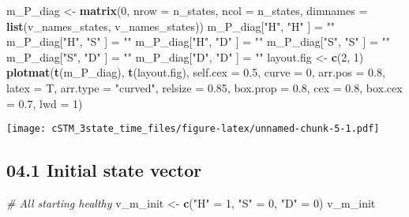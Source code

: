 \documentclass[
]{article}
\newenvironment{Shaded}{\begin{snugshade}}{\end{snugshade}}
\newcommand{\AttributeTok}[1]{\textcolor[rgb]{0.13,0.29,0.53}{#1}}
\newcommand{\CommentTok}[1]{\textcolor[rgb]{0.56,0.35,0.01}{\textit{#1}}}
\newcommand{\DecValTok}[1]{\textcolor[rgb]{0.00,0.00,0.81}{#1}}
\newcommand{\FloatTok}[1]{\textcolor[rgb]{0.00,0.00,0.81}{#1}}
\newcommand{\FunctionTok}[1]{\textcolor[rgb]{0.13,0.29,0.53}{\textbf{#1}}}
\newcommand{\NormalTok}[1]{#1}
\newcommand{\OtherTok}[1]{\textcolor[rgb]{0.56,0.35,0.01}{#1}}
\newcommand{\StringTok}[1]{\textcolor[rgb]{0.31,0.60,0.02}{#1}}
\begin{document}
\begin{Shaded}
\begin{Highlighting}[]
\NormalTok{m\_P\_diag }\OtherTok{\textless{}{-}} \FunctionTok{matrix}\NormalTok{(}\DecValTok{0}\NormalTok{, }\AttributeTok{nrow =}\NormalTok{ n\_states, }\AttributeTok{ncol =}\NormalTok{ n\_states, }\AttributeTok{dimnames =} \FunctionTok{list}\NormalTok{(v\_names\_states, v\_names\_states))}
\NormalTok{m\_P\_diag[}\StringTok{"H"}\NormalTok{, }\StringTok{"H"}\NormalTok{ ] }\OtherTok{=} \StringTok{""}
\NormalTok{m\_P\_diag[}\StringTok{"H"}\NormalTok{, }\StringTok{"S"}\NormalTok{ ] }\OtherTok{=} \StringTok{""} 
\NormalTok{m\_P\_diag[}\StringTok{"H"}\NormalTok{, }\StringTok{"D"}\NormalTok{ ] }\OtherTok{=} \StringTok{""}
\NormalTok{m\_P\_diag[}\StringTok{"S"}\NormalTok{, }\StringTok{"S"}\NormalTok{ ] }\OtherTok{=} \StringTok{""}
\NormalTok{m\_P\_diag[}\StringTok{"S"}\NormalTok{, }\StringTok{"D"}\NormalTok{ ] }\OtherTok{=} \StringTok{""}
\NormalTok{m\_P\_diag[}\StringTok{"D"}\NormalTok{, }\StringTok{"D"}\NormalTok{ ] }\OtherTok{=} \StringTok{""}
\NormalTok{layout.fig }\OtherTok{\textless{}{-}} \FunctionTok{c}\NormalTok{(}\DecValTok{2}\NormalTok{, }\DecValTok{1}\NormalTok{)}
\FunctionTok{plotmat}\NormalTok{(}\FunctionTok{t}\NormalTok{(m\_P\_diag), }\FunctionTok{t}\NormalTok{(layout.fig), }\AttributeTok{self.cex =} \FloatTok{0.5}\NormalTok{, }\AttributeTok{curve =} \DecValTok{0}\NormalTok{, }\AttributeTok{arr.pos =} \FloatTok{0.8}\NormalTok{,  }
        \AttributeTok{latex =}\NormalTok{ T, }\AttributeTok{arr.type =} \StringTok{"curved"}\NormalTok{, }\AttributeTok{relsize =} \FloatTok{0.85}\NormalTok{, }\AttributeTok{box.prop =} \FloatTok{0.8}\NormalTok{, }
        \AttributeTok{cex =} \FloatTok{0.8}\NormalTok{, }\AttributeTok{box.cex =} \FloatTok{0.7}\NormalTok{, }\AttributeTok{lwd =} \DecValTok{1}\NormalTok{)}
\end{Highlighting}
\end{Shaded}

\texttt{[image: cSTM\_3state\_time\_files/figure-latex/unnamed-chunk-5-1.pdf]}

\hypertarget{initial-state-vector}{%
\subsection{04.1 Initial state vector}\label{initial-state-vector}}

\begin{Shaded}
\begin{Highlighting}[]
\CommentTok{\# All starting healthy}
\NormalTok{v\_m\_init }\OtherTok{\textless{}{-}} \FunctionTok{c}\NormalTok{(}\StringTok{"H"} \OtherTok{=} \DecValTok{1}\NormalTok{, }\StringTok{"S"} \OtherTok{=} \DecValTok{0}\NormalTok{, }\StringTok{"D"} \OtherTok{=} \DecValTok{0}\NormalTok{)  }
\NormalTok{v\_m\_init}
\end{Highlighting}
\end{Shaded}
\end{document}

